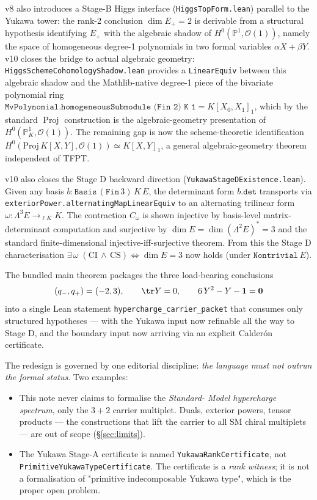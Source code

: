 v8 also introduces a Stage-B Higgs interface
(\texttt{HiggsTopForm.lean}) parallel to the Yukawa tower:
the rank-2 conclusion $\dim E_+ = 2$ is derivable from a
structural hypothesis identifying $E_+$ with the algebraic
shadow of $H^0(\mathbb P^1, \mathcal O(1))$, namely the space
of homogeneous degree-1 polynomials in two formal variables
$\alpha X + \beta Y$. v10 closes the bridge to actual algebraic
geometry: \texttt{HiggsSchemeCohomologyShadow.lean} provides a
\texttt{LinearEquiv} between this algebraic shadow and the
Mathlib-native degree-1 piece of the bivariate polynomial ring
$\texttt{MvPolynomial.homogeneousSubmodule (Fin 2) K 1}
= K[X_0, X_1]_1$, which by the standard $\operatorname{Proj}$
construction is the algebraic-geometry presentation of
$H^0(\mathbb P^1_K, \mathcal O(1))$. The remaining gap is now
the scheme-theoretic identification
$H^0(\mathrm{Proj}\,K[X, Y], \mathcal O(1)) \simeq K[X, Y]_1$,
a general algebraic-geometry theorem independent of TFPT.

v10 also closes the Stage D backward direction
(\texttt{YukawaStageDExistence.lean}). Given any basis
$b : \texttt{Basis}\,(\texttt{Fin}\,3)\,K\,E$, the determinant
form $b.\texttt{det}$ transports via
\texttt{exteriorPower.alternatingMapLinearEquiv} to an
alternating trilinear form $\omega : \Lambda^3 E \to_{\ell K} K$.
The contraction $C_\omega$ is shown injective by basis-level
matrix-determinant computation and surjective by
$\dim E = \dim(\Lambda^2 E)^* = 3$ and the standard
finite-dimensional injective-iff-surjective theorem. From this
the Stage D characterisation
$\exists\,\omega\;(\textrm{CI}\,\wedge\,\textrm{CS})
  \iff \dim E = 3$ now holds (under $\texttt{Nontrivial}\,E$).

The bundled main theorem packages the three load-bearing
conclusions
\[
(q_-,q_+)=(-2,3), \qquad \tr Y=0, \qquad 6\,Y^2 - Y - \mathbf 1 = \mathbf 0
\]
into a single Lean statement \texttt{hypercharge\_carrier\_packet}
that consumes only structured hypotheses --- with the Yukawa
input now refinable all the way to Stage D, and the boundary
input now arriving via an explicit Calder\'on certificate.

The redesign is governed by one editorial discipline: \emph{the
language must not outrun the formal status}. Two examples:

\begin{itemize}[leftmargin=1.6em, itemsep=2pt]
\item This note never claims to formalise the \emph{Standard-
    Model hypercharge spectrum}, only the $3+2$ carrier
    multiplet. Duals, exterior powers, tensor products --- the
    constructions that lift the carrier to all SM chiral
    multiplets --- are out of scope (\S\ref{sec:limits}).
\item The Yukawa Stage-A certificate is named
    \texttt{YukawaRankCertificate}, not
    \texttt{PrimitiveYukawaTypeCertificate}. The certificate is
    a \emph{rank witness}; it is not a formalisation of
    "primitive indecomposable Yukawa type", which is the proper
    open problem.
\end{itemize}

